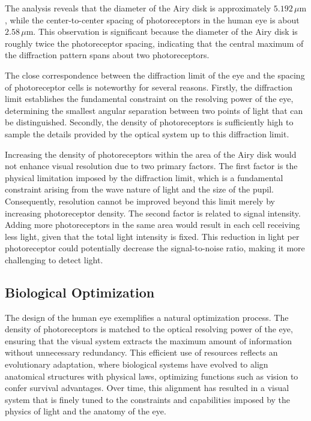 \documentclass[
  a4paper,
]{book}
\begin{document}
\begin{tcolorbox}[enhanced jigsaw, coltitle=black, title=\textcolor{quarto-callout-note-color}{\faInfo}\hspace{0.5em}{Analysis of the Results}, colframe=quarto-callout-note-color-frame, toprule=.15mm, opacitybacktitle=0.6, left=2mm, opacityback=0, breakable, toptitle=1mm, bottomtitle=1mm, leftrule=.75mm, arc=.35mm, titlerule=0mm, colbacktitle=quarto-callout-note-color!10!white, rightrule=.15mm, bottomrule=.15mm, colback=white]

The analysis reveals that the diameter of the Airy disk is approximately
\(5.192\, \mu\text{m}\), while the center-to-center spacing of
photoreceptors in the human eye is about \(2.58\, \mu\text{m}\). This
observation is significant because the diameter of the Airy disk is
roughly twice the photoreceptor spacing, indicating that the central
maximum of the diffraction pattern spans about two photoreceptors.

The close correspondence between the diffraction limit of the eye and
the spacing of photoreceptor cells is noteworthy for several reasons.
Firstly, the diffraction limit establishes the fundamental constraint on
the resolving power of the eye, determining the smallest angular
separation between two points of light that can be distinguished.
Secondly, the density of photoreceptors is sufficiently high to sample
the details provided by the optical system up to this diffraction limit.

Increasing the density of photoreceptors within the area of the Airy
disk would not enhance visual resolution due to two primary factors. The
first factor is the physical limitation imposed by the diffraction
limit, which is a fundamental constraint arising from the wave nature of
light and the size of the pupil. Consequently, resolution cannot be
improved beyond this limit merely by increasing photoreceptor density.
The second factor is related to signal intensity. Adding more
photoreceptors in the same area would result in each cell receiving less
light, given that the total light intensity is fixed. This reduction in
light per photoreceptor could potentially decrease the signal-to-noise
ratio, making it more challenging to detect light.

\subsection{Biological Optimization}\label{biological-optimization}

The design of the human eye exemplifies a natural optimization process.
The density of photoreceptors is matched to the optical resolving power
of the eye, ensuring that the visual system extracts the maximum amount
of information without unnecessary redundancy. This efficient use of
resources reflects an evolutionary adaptation, where biological systems
have evolved to align anatomical structures with physical laws,
optimizing functions such as vision to confer survival advantages. Over
time, this alignment has resulted in a visual system that is finely
tuned to the constraints and capabilities imposed by the physics of
light and the anatomy of the eye.


\end{tcolorbox}
\end{document}
